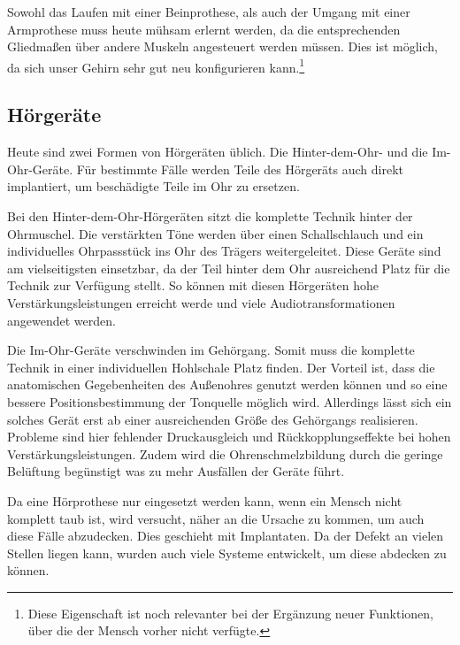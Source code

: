 Sowohl das Laufen mit einer Beinprothese, als auch der Umgang mit einer Armprothese muss heute mühsam
erlernt werden, da die entsprechenden Gliedmaßen über andere Muskeln angesteuert werden müssen. Dies
ist möglich, da sich unser Gehirn sehr gut neu konfigurieren kann.\footnote{Diese Eigenschaft ist
noch relevanter bei der Ergänzung neuer Funktionen, über die der Mensch vorher nicht verfügte.}

\subsection{Hörgeräte}
\label{sec:Robin:topical:hearing_aid}
Heute sind zwei Formen von Hörgeräten üblich. Die Hinter-dem-Ohr- und die Im-Ohr-Geräte. Für
bestimmte Fälle werden Teile des Hörgeräts auch direkt implantiert, um beschädigte Teile im Ohr zu
ersetzen.

Bei den Hinter-dem-Ohr-Hörgeräten sitzt die komplette Technik hinter der Ohrmuschel. Die verstärkten
Töne werden über einen Schallschlauch und ein individuelles Ohrpassstück ins Ohr des Trägers
weitergeleitet. Diese Geräte sind am vielseitigsten einsetzbar, da der Teil hinter dem Ohr
ausreichend Platz für die Technik zur Verfügung stellt. So können mit diesen Hörgeräten hohe
Verstärkungsleistungen erreicht werde und viele Audiotransformationen angewendet werden.

Die Im-Ohr-Geräte verschwinden im Gehörgang. Somit muss die komplette Technik in einer individuellen
Hohlschale Platz finden. Der Vorteil ist, dass die anatomischen Gegebenheiten des Außenohres genutzt
werden können und so eine bessere Positionsbestimmung der Tonquelle möglich wird. Allerdings lässt
sich ein solches Gerät erst ab einer ausreichenden Größe des Gehörgangs realisieren. Probleme sind
hier fehlender Druckausgleich und Rückkopplungseffekte bei hohen Verstärkungsleistungen. Zudem wird
die Ohrenschmelzbildung durch die geringe Belüftung begünstigt was zu mehr Ausfällen der Geräte
führt.

\bigskip
Da eine Hörprothese nur eingesetzt werden kann, wenn ein Mensch nicht komplett taub ist, wird
versucht, näher an die Ursache zu kommen, um auch diese Fälle abzudecken. Dies geschieht mit
Implantaten. Da der Defekt an vielen Stellen liegen kann, wurden auch viele Systeme entwickelt, um
diese abdecken zu können.

